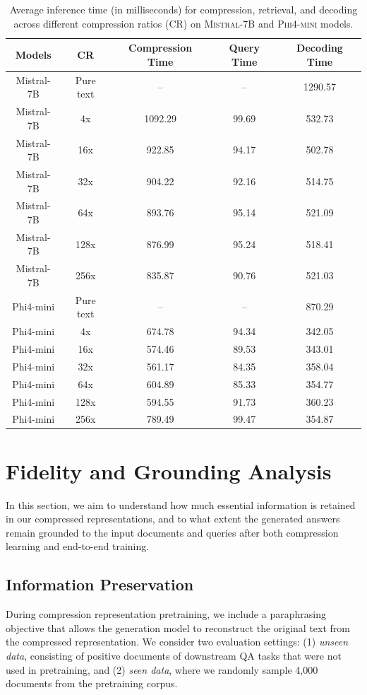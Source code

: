 \documentclass{applemlr}
\numberwithin{equation}{section}
\begin{document}
\begin{table}[H]
\scriptsize
\centering
\begin{tabular}{c |c| c c c }
\bottomrule
\textbf{Models} & \textbf{CR} & \textbf{Compression Time} & \textbf{Query Time} & \textbf{Decoding Time}  \\
\hline  
Mistral-7B & Pure text& -- &--&1290.57\\
Mistral-7B& 4x& 1092.29&99.69&532.73\\
Mistral-7B& 16x& 922.85&94.17&502.78\\
Mistral-7B& 32x& 904.22&92.16&514.75 \\
Mistral-7B& 64x& 893.76&95.14&521.09\\
Mistral-7B& 128x&876.99&95.24&518.41 \\
Mistral-7B& 256x& 835.87&90.76&521.03 \\
\hline 
Phi4-mini&Pure text &--&--&870.29\\
Phi4-mini& 4x& 674.78&94.34&342.05\\
Phi4-mini& 16x& 574.46&89.53&343.01\\
Phi4-mini& 32x& 561.17&84.35&358.04\\
Phi4-mini& 64x&604.89&85.33&354.77 \\
Phi4-mini& 128x&594.55&91.73&360.23 \\
Phi4-mini& 256x&789.49&99.47&354.87 \\
\toprule
\end{tabular}
\caption{Average inference time (in milliseconds) for compression, retrieval, and decoding across different compression ratios (CR) on \textsc{Mistral-7B} and \textsc{Phi4-mini} models.}
\label{efficiency}
\end{table}


\section{Fidelity and Grounding Analysis}
\label{app:fied_ground}
In this section, we aim to understand how much essential information is retained in our compressed representations, 
and to what extent the generated answers remain grounded to the input documents and queries after both compression learning 
and end-to-end training.

\subsection{Information Preservation}

During compression representation pretraining, we include a paraphrasing objective that allows the generation model 
to reconstruct the original text from the compressed representation. 
We consider two evaluation settings: (1) \textit{unseen data}, consisting of positive documents of downstream QA tasks that were not used in pretraining, 
and (2) \textit{seen data}, where we randomly sample 4,000 documents from the pretraining corpus. 
\end{document}
